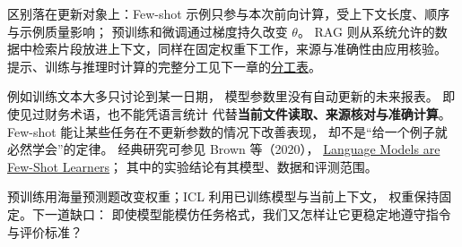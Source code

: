 区别落在更新对象上：Few-shot 示例只参与本次前向计算，受上下文长度、顺序与示例质量影响；
预训练和微调通过梯度持久改变 $\theta$。
RAG 则从系统允许的数据中检索片段放进上下文，同样在固定权重下工作，来源与准确性由应用核验。
提示、训练与推理时计算的完整分工见下一章的\hyperref[sec:training-inference-roles]{分工表}。


例如训练文本大多只讨论到某一日期，
模型参数里没有自动更新的未来报表。
即使见过财务术语，也不能凭语言统计
代替\textbf{当前文件读取、来源核对与准确计算}。
Few-shot 能让某些任务在不更新参数的情况下改善表现，
却不是“给一个例子就必然学会”的定律。
经典研究可参见 Brown 等（2020），
\href{https://arxiv.org/abs/2005.14165}{Language Models are Few-Shot Learners}；
其中的实验结论有其模型、数据和评测范围。



\par\smallskip
预训练用海量预测题改变权重；ICL 利用已训练模型与当前上下文，
权重保持固定。下一道缺口：
即使模型能模仿任务格式，我们又怎样让它更稳定地遵守指令与评价标准？\label{route:icl-end}
